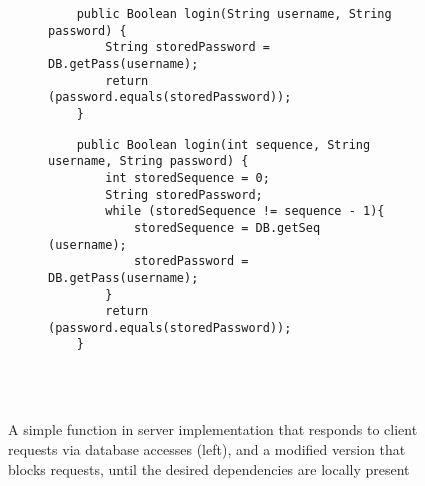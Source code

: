 \begin{figure}[t]
    \begin{subfigure}[t]{0.48\textwidth}
        \centering
	\begin{lstlisting}
	public Boolean login(String username, String password) {
		String storedPassword = DB.getPass(username);
		return (password.equals(storedPassword));
	}
	\end{lstlisting}
	\label{fig:modified_bb}
    \end{subfigure}
    \quad 
    \begin{subfigure}[t]{0.48\textwidth}
        \centering
	\begin{lstlisting}
	public Boolean login(int sequence, String username, String password) {
		int storedSequence = 0; 
		String storedPassword;
		while (storedSequence != sequence - 1){
			storedSequence = DB.getSeq (username);
			storedPassword = DB.getPass(username);
		}
		return (password.equals(storedPassword));
	}
	\end{lstlisting}
        \label{fig:simple_bb}
    \end{subfigure} 
    \\ \hrulefill \\
\caption{A simple function in server implementation that responds to client
requests via database accesses (left), and a modified version that blocks
requests, until the desired dependencies are locally present}
\label{fig:haskel_code}
\end{figure}




